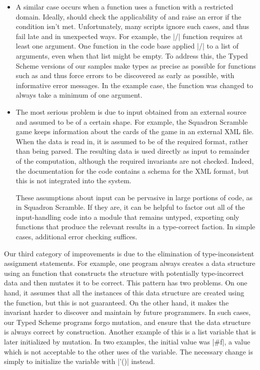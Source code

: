 \begin{schemeregion}
\begin{itemize}
  \item A similar case occurs when a function  uses a function 
    with a restricted domain. Ideally,  should check the
    applicability of  and raise an error if the condition isn't
    met. Unfortunately, many scripts ignore such cases, and thus fail
    late and in unexpected ways. For example, the \scheme|/| function
    requires at least one argument.  One function in the code base
    applied \scheme|/| to a list of arguments, even when that list
    might be empty.  To address this, the Typed Scheme versions
    of our samples make types as precise as possible for functions such as
     and thus force errors to be discovered as early as possible,
    with informative error messages.  In the example case, the
    function was changed to always take a minimum of one argument.

  \item The most serious problem is due to input obtained from an
    external source and assumed to be of a certain shape.  For
    example, the Squadron Scramble game keeps information about the
    cards of the game in an external XML file.  When the data
    is read in, it is assumed to be of the required format, rather
    than being parsed.  The resulting data is used directly as input
    to remainder of the computation, although
    the required invariants are not checked.  Indeed, the documentation for the code
    contains a schema for the XML format, but this is not integrated into
    the system.

    These assumptions about input can be pervasive in large portions
    of  code, as in Squadron Scramble.  If they are, it
    can be helpful to factor out all of the input-handling code into a
    module that remains untyped, exporting only functions that produce
    the relevant results in a type-correct faction.  In
    simple cases, additional error checking  suffices.

\end{itemize}

Our third category of improvements is due to the elimination of
type-inconsistent assignment statements.  For example,  one program
always creates a data structure  using an  
function that constructs the structure with potentially
type-incorrect data and then mutates it to be correct.  This pattern
has two problems.  On one hand, it assumes that all the instances of
this data structure are created using the  function, but
this is not guaranteed.  On the other hand, it makes the invariant
harder to discover and maintain by future programmers.
In such cases, our Typed Scheme programs forgo mutation, and ensure
that the data structure is always correct by construction.  Another
example of this is a list variable that is later initialized by
mutation.  In two examples, the initial value was \scheme|#f|, a value
which is not acceptable to the other uses of the variable.  The
necessary change is simply to initialize the variable with
\scheme|'()| instead.


\end{schemeregion}
